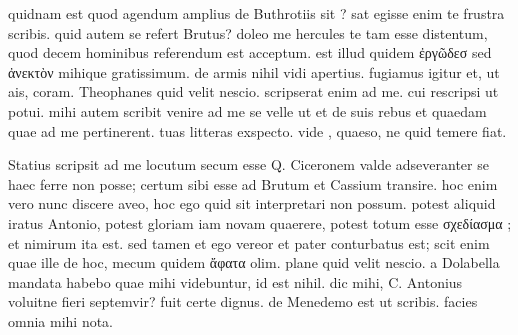 


 quidnam est quod agendum amplius de Buthrotiis sit ? sat egisse enim te frustra scribis. quid autem se refert Brutus? doleo me hercules te tam esse distentum, quod decem hominibus referendum est acceptum. est illud quidem ἐργῶδεσ sed ἀνεκτὸν mihique gratissimum. de armis nihil vidi apertius. fugiamus igitur et, ut ais, coram. Theophanes quid velit nescio. scripserat enim ad me. cui rescripsi ut potui. mihi autem scribit venire ad me se velle ut et de suis rebus et quaedam quae ad me pertinerent. tuas litteras exspecto. vide , quaeso, ne quid temere fiat.

 Statius scripsit ad me locutum secum esse Q. Ciceronem valde adseveranter se haec ferre non posse; certum sibi esse ad Brutum et Cassium transire. hoc enim vero nunc discere aveo, hoc ego quid sit interpretari non possum. potest aliquid iratus Antonio, potest gloriam iam novam quaerere, potest totum esse σχεδίασμα ; et nimirum ita est. sed tamen et ego vereor et pater conturbatus est; scit enim quae ille de hoc, mecum quidem ἄφατα olim. plane quid velit nescio. a Dolabella mandata habebo quae mihi videbuntur, id est nihil. dic mihi, C. Antonius voluitne fieri septemvir? fuit certe dignus. de Menedemo est ut scribis. facies omnia mihi nota.
